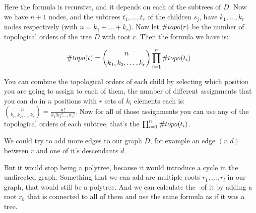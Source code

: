 Here the formula is recursive, and it depends on each of the subtrees of $D$. Now we have $n+1$ nodes, and the subtrees $t_1, \dots, t_r$ of the children $s_j$, have $k_1, \dots, k_r$ nodes respectively (with $n= k_1 + \dots + k_r$). Now let $\#topo(r)$ be the number of topological orders of the tree $D$ with root $r$. Then the formula we have is: 

$$\#topo(t) =  \binom{n}{k_1, k_2, \ldots, k_r} \prod_{i=1}^{n} \#topo(t_i)$$

You can combine the topological orders of each child by selecting which position you are going to assign to each of them, the number of different assignments that you can do in $n$ positions with $r$ sets of $k_i$ elements each is: $ \binom{n}{k_1, k_2, \ldots, k_r}= \frac{n!}{k_1! k_2! \ldots, k_r!}$. Now for all of those assignments you can use any of the topological orders of each subtree, that's the $\prod_{i=1}^{n} \#topo(t_i)$.

We could try to add more edges to our graph $D$, for example an edge $(r,d)$ between $r$ and one of it's descendants $d$.

\begin{figure}[ht]
\centering 
\end{figure}

But it would stop being a polytree, because it would introduce a cycle in the undirected graph. Something that we can add are multiple roots $r_1, \dots, r_l$ in our graph, that would still be a polytree. And we can calculate the \numTopo \ of it by adding a root $r_0$ that is connected to all of them and use the same formula as if it was a tree. 

